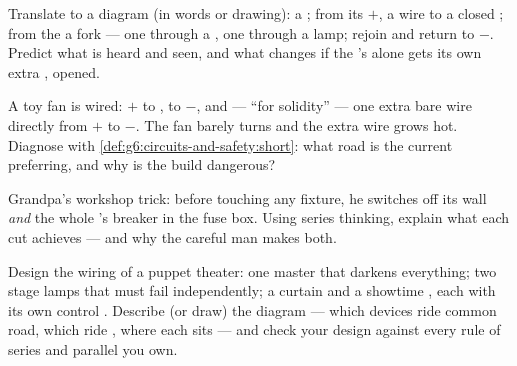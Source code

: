 \begin{exercise}[$\star\star$]\label{exo:g6:circuits-and-safety:9}
Translate to a diagram (in words or drawing): a ; from its
$+$, a wire to a closed ; from the  a fork --- one
 through a , one through a lamp;  rejoin and
return to $-$. Predict what is heard and seen, and what changes if
the 's  alone gets its own extra , opened.
\end{exercise}

\begin{exercise}[$\star\star$]\label{exo:g6:circuits-and-safety:10}
A toy fan is wired:  $+$ to ,  to  $-$,
and --- ``for solidity'' --- one extra bare wire directly from
$+$ to $-$. The fan barely turns and the extra wire grows hot.
Diagnose with \cref{def:g6:circuits-and-safety:short}: what road
is the current preferring, and why is the build dangerous?
\end{exercise}

\begin{exercise}[$\star\star$]\label{exo:g6:circuits-and-safety:11}
Grandpa's workshop trick: before touching any  fixture, he
switches off its wall  \emph{and} the whole 's
breaker in the fuse box. Using series thinking, explain what each
cut achieves --- and why the careful man makes both.
\end{exercise}

\begin{exercise}[$\star\star\star$]\label{exo:g6:circuits-and-safety:12}
Design the wiring of a puppet theater: one master  that
darkens everything; two stage lamps that must fail independently;
a curtain  and a showtime , each with its own control
. Describe (or draw) the diagram --- which devices ride
common road, which ride , where each  sits --- and
check your design against every rule of series and parallel you
own.
\end{exercise}

